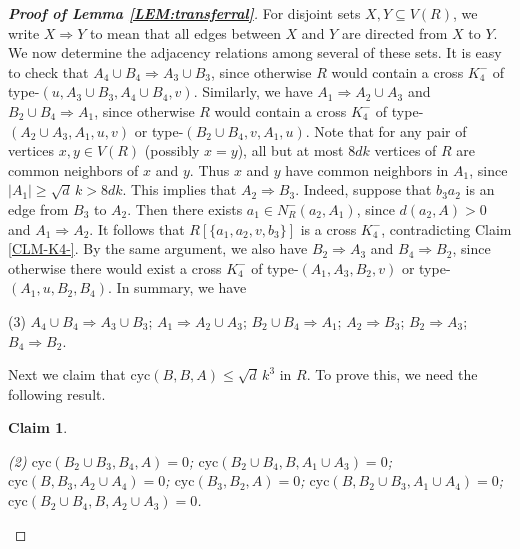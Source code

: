 \documentclass[11pt,a4paper,reqno]{amsart}
\newtheorem{claim}{Claim}
\theoremstyle{definition} %
\begin{document}
\begin{proof}[\textbf{Proof of Lemma \ref{LEM:transferral}}]
For disjoint sets $X,Y\subseteq V(R)$, we write $X \Rightarrow Y$ to mean that all edges between $X$ and $Y$ are directed from $X$ to $Y$. We now determine the adjacency relations among several of these sets. It is easy to check that
$A_4\cup B_4\Rightarrow A_3\cup B_3$,
since otherwise $R$ would contain a cross $K_4^-$ of type-$(u,A_3\cup B_3,A_4\cup B_4,v)$. Similarly, we have
$A_1\Rightarrow A_2\cup A_3$
and
$B_2\cup B_4\Rightarrow A_1$,
since otherwise $R$ would contain a cross $K_4^-$ of type-$(A_2\cup A_3,A_1,u,v)$ or type-$(B_2\cup B_4,v,A_1,u)$. Note that for any pair of vertices $x,y\in V(R)$ (possibly $x=y$), all but at most $8dk$ vertices of $R$ are common neighbors of $x$ and $y$. Thus $x$ and $y$ have common neighbors in $A_1$, since $|A_1|\geqslant \sqrt d\, k>8dk$. This implies that $A_2\Rightarrow B_3$. Indeed, suppose that $b_3a_2$ is an edge from $B_3$ to $A_2$. Then there exists $a_1\in N_R^{-}(a_2,A_1)$, since $d(a_2,A)>0$ and $A_1 \Rightarrow A_2$. It follows that $R[\{a_1,a_2,v,b_3\}]$ is a cross $K_4^-$, contradicting Claim \ref{CLM-K4-}. By the same argument, we also have
$B_2\Rightarrow A_3$
and
$B_4\Rightarrow B_2$,
since otherwise there would exist a cross $K_4^-$ of type-$(A_1,A_3,B_2,v)$ or type-$(A_1,u,B_2,B_4)$. In summary, we have 

\smallskip
\begin{tasks}[label=\textbullet](3)
    \task $A_4\cup B_4\Rightarrow A_3\cup B_3$;
    \task $A_1\Rightarrow A_2\cup A_3$;
    \task $B_2\cup B_4\Rightarrow A_1$;
    \task $A_2\Rightarrow B_3$;
    \task $B_2\Rightarrow A_3$;
    \task $B_4\Rightarrow B_2$.
\end{tasks}
\smallskip

Next we claim that $\text{cyc}(B,B,A)\leqslant \sqrt d\, k^3$ in $R$. To prove this, we need the following result.


\begin{claim}\label{CLAIM:type of BBA}
\text{ }
\begin{tasks}(2)
    \task $\text{cyc}(B_2\cup B_3,B_4,A)=0$\rm{;}
    \task $\text{cyc}(B_2\cup B_4,B,A_1\cup A_3)=0$\rm{;}
    \task $\text{cyc}(B,B_3,A_2\cup A_4)=0$\rm{;}
    \task $\text{cyc}(B_3,B_2,A)=0$\rm{;}
    \task $\text{cyc}(B,B_2\cup B_3,A_1\cup A_4)=0$\rm{;}
    \task $\text{cyc}(B_2\cup B_4,B,A_2\cup A_3)=0$.
\end{tasks}
\end{claim}


\end{proof}
\end{document}
